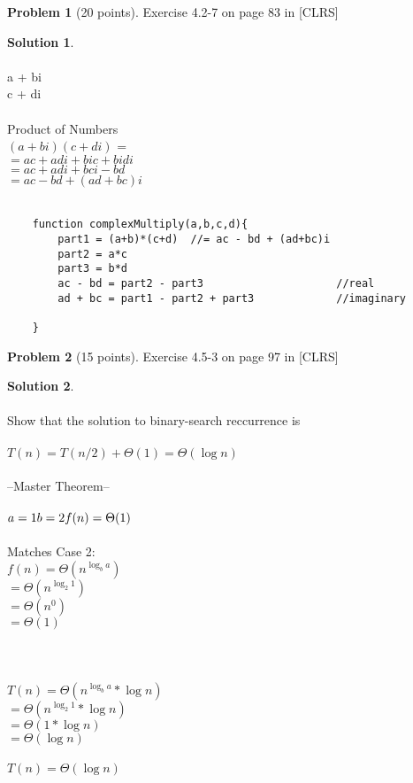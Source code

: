 \documentclass{article}
\theoremstyle{definition}
\newtheorem{problem}{Problem}
\newtheorem*{solution}{Solution}
\begin{document}
\newpage

\begin{problem}[20 points]
Exercise 4.2-7 on page 83 in [CLRS]
\end{problem}
\begin{solution} \\
\\
a + bi\\
c + di\\
\\
Product of Numbers \\
$(a+bi)(c+di)$ =\\ 
$= ac +adi + bic + bidi$\\
$= ac + adi + bci - bd$\\
$= ac - bd + (ad+bc)i$\\
\\
\begin{verbatim}
    function complexMultiply(a,b,c,d){
        part1 = (a+b)*(c+d)  //= ac - bd + (ad+bc)i
        part2 = a*c   
        part3 = b*d    
        ac - bd = part2 - part3                     //real
        ad + bc = part1 - part2 + part3             //imaginary
        
    }
\end{verbatim}

\end{solution}

\newpage

\begin{problem}[15 points]
Exercise 4.5-3 on page 97 in [CLRS] 
\end{problem}
\begin{solution} \\
\\
Show that the solution to binary-search reccurrence is \\
\\
$T(n) = T(n/2) + \Theta(1) = \Theta(\log{n})$\\
\\
--Master Theorem--\\
\\
$a=1\\ b=2\\ f(n) = \Theta(1)$\\
\\
Matches Case 2:\\
$f(n) = \Theta(n^{\log_b{a}})$\\
$= \Theta(n^{\log_2{1}})$\\
$= \Theta(n^{0})$\\
$= \Theta(1)$\\
\\
\therefore\\
\\
$T(n) = \Theta(n^{\log_b{a}} * \log{n})$\\
$= \Theta(n^{\log_2{1}} * \log{n})$\\
$= \Theta(1 * \log{n})$\\
$= \Theta(\log{n})$\\
\\
$T(n) = \Theta(\log{n})$\\


\end{solution}



\medskip



\goodbreak
\checklist
\end{document}
